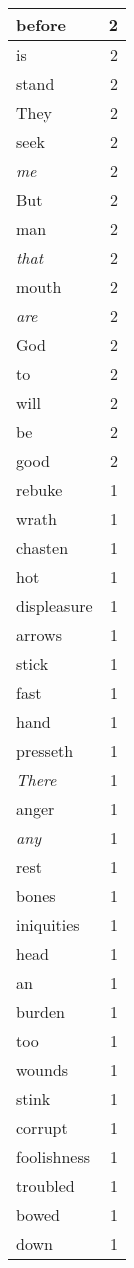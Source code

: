 \begin{center}
\begin{longtable}{l|r}
before & 2\\ \hline 
is & 2\\ \hline 
stand & 2\\ \hline 
They & 2\\ \hline 
seek & 2\\ \hline 
\emph{me} & 2\\ \hline 
But & 2\\ \hline 
man & 2\\ \hline 
\emph{that} & 2\\ \hline 
mouth & 2\\ \hline 
\emph{are} & 2\\ \hline 
God & 2\\ \hline 
to & 2\\ \hline 
will & 2\\ \hline 
be & 2\\ \hline 
good & 2\\ \hline 
rebuke & 1\\ \hline 
wrath & 1\\ \hline 
chasten & 1\\ \hline 
hot & 1\\ \hline 
displeasure & 1\\ \hline 
arrows & 1\\ \hline 
stick & 1\\ \hline 
fast & 1\\ \hline 
hand & 1\\ \hline 
presseth & 1\\ \hline 
\emph{There} & 1\\ \hline 
anger & 1\\ \hline 
\emph{any} & 1\\ \hline 
rest & 1\\ \hline 
bones & 1\\ \hline 
iniquities & 1\\ \hline 
head & 1\\ \hline 
an & 1\\ \hline 
burden & 1\\ \hline 
too & 1\\ \hline 
wounds & 1\\ \hline 
stink & 1\\ \hline 
corrupt & 1\\ \hline 
foolishness & 1\\ \hline 
troubled & 1\\ \hline 
bowed & 1\\ \hline 
down & 1\\ \hline 

\end{longtable}
\end{center}
